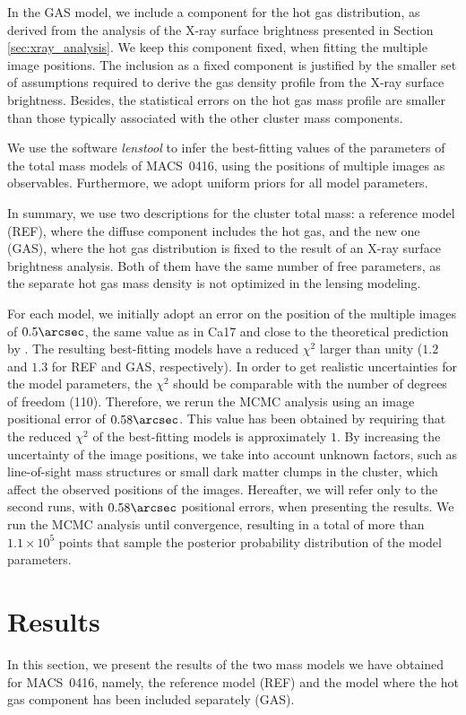 \documentclass[twocolumn]{aastex61}
\begin{document}
In the GAS model, we include a component for the hot gas distribution, as derived
from the analysis of the X-ray surface brightness presented in Section \ref{sec:xray_analysis}.
We keep this component fixed, when fitting the multiple image positions.
The inclusion as a fixed component is justified by the smaller set of
assumptions required to derive the gas density profile from
the X-ray surface brightness.
Besides, the statistical errors on the hot gas mass profile are smaller than
those typically associated with the other cluster mass components.

We use the software \emph{lenstool} \citep{Jullo2007} to infer the best-fitting
values of the parameters of the total mass models of MACS~0416, using the
positions of multiple images as observables.
Furthermore, we adopt uniform priors for all model parameters.

In summary, we use two descriptions for the cluster total mass: a reference model (REF), where the
diffuse component includes the hot gas, and the new one (GAS), where the hot gas
distribution is fixed to the result of an X-ray surface brightness analysis.
Both of them have the same number of free parameters, as the separate hot gas
mass density is not optimized in the lensing modeling.

For each model, we initially adopt an error on the position of the multiple images
of $0.5\arcsec$, the same value as in Ca17 and close to the theoretical prediction
by \citet{Jullo2010}.
The resulting best-fitting models have a reduced $\chi^2$ larger than unity
($1.2$ and $1.3$ for REF and GAS, respectively).
In order to get realistic uncertainties for the model parameters, the $\chi^2$
should be comparable with the number of degrees of freedom (110).
Therefore, we rerun the MCMC analysis using an image positional error of $0.58\arcsec$.
This value has been obtained by requiring that the reduced $\chi^2$ of the
best-fitting models is approximately $1$.
By increasing the uncertainty of the image positions, we take into
account unknown factors, such as line-of-sight mass structures or small
dark matter clumps in the cluster, which affect the observed positions of the images.
Hereafter, we will refer only to the second runs, with $0.58\arcsec$ positional errors, when
presenting the results.
We run the MCMC analysis until convergence, resulting in a total of more than $1.1 \times 10^5$
points that sample the posterior probability distribution of the model parameters.


\section{Results}
\label{sec:results}
In this section, we present the results of the two mass models we have obtained
for MACS~0416, namely, the reference model (REF) and the model where
the hot gas component has been included separately (GAS).
\end{document}
